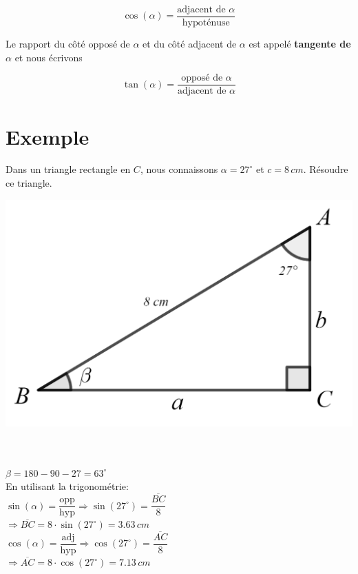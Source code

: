 \documentclass[a4paper,11pt]{article}
\begin{document}
$$\cos(\alpha)=\frac{\text{adjacent de }\alpha}{\text{hypoténuse}}$$

Le rapport du côté opposé de $\alpha$ et du côté adjacent de $\alpha$ est appelé \textbf{tangente de $\alpha$} et nous écrivons

$$\tan(\alpha)=\frac{\text{opposé de }\alpha}{\text{adjacent de }\alpha}$$


\section{Exemple}
Dans un triangle rectangle en $C$, nous connaissons $\alpha=27^{\circ}$ et $c=8\,cm$. Résoudre ce triangle.\\
\begin{multicols}{2}
\begin{center}
\includegraphics[width=1\textwidth]{images/trianglerectexemple.png}\\
\end{center}
\phantom{a}\\
\phantom{a}\\
$\beta=180-90-27=63^{\circ}$\\
En utilisant la trigonométrie:\\
$\sin(\alpha)=\dfrac{\text{opp}}{\text{hyp}} \Rightarrow \sin(27^{\circ})=\dfrac{\overline{BC}}{8}$\\
$\Rightarrow \overline{BC}=8 \cdot \sin(27^{\circ})=3.63\,cm$\\
$\cos(\alpha)=\dfrac{\text{adj}}{\text{hyp}} \Rightarrow \cos(27^{\circ})=\dfrac{\overline{AC}}{8}$\\
$\Rightarrow \overline{AC}=8 \cdot \cos(27^{\circ})=7.13\,cm$\\
\end{multicols}
\end{document}
